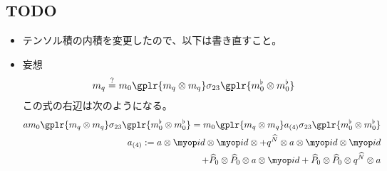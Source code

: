 {\subsection{TODO}\label{s2:TODO} %
	\begin{itemize}\setlength{\itemsep}{-1mm} %
		\item テンソル積の内積を変更したので、以下は書き直すこと。
		\item 妄想
		\begin{equation*}\begin{split}
			m_q \overset{?}{=} m_0\gplr{m_q\otimes m_q}\sigma_{23}
			\gplr{m_0^\flat\otimes m_0^\flat}
		\end{split}\end{equation*}
		この式の右辺は次のようになる。
		\begin{equation*}\begin{split}
			a m_0\gplr{m_q\otimes m_q}\sigma_{23}
				\gplr{m_0^\flat\otimes m_0^\flat}
			= m_0\gplr{m_q\otimes m_q}a_{(4)}\sigma_{23}
				\gplr{m_0^\flat\otimes m_0^\flat} \\
			a_{(4)} := a\otimes\id\otimes\id\otimes
				+ q^{\Nhat}\otimes a\otimes\id\otimes\id \\
				+ \Phat_0\otimes\Phat_0\otimes a\otimes\id
				+ \Phat_0\otimes\Phat_0\otimes q^{\Nhat}\otimes a
		\end{split}\end{equation*}
	\end{itemize} %

}
